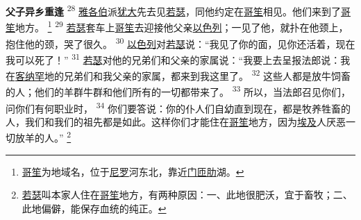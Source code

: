 \textbf{父子异乡重逢 }
\textsuperscript{28}
\uline{雅各伯}派\uline{犹大}先去见\uline{若瑟}，同他约定在\uline{哥笙}相见。他们来到了\uline{哥笙}地方。
\footnote{\uline{哥笙}为地域名，位于\uline{尼罗}河东北，靠近\uline{门匝肋}湖。}
\textsuperscript{29}
\uline{若瑟}套车上\uline{哥笙}去迎接他父亲\uline{以色列}；一见了他，就扑在他颈上，抱住他的颈，哭了很久。
\textsuperscript{30}
\uline{以色列}对\uline{若瑟}说：“我见了你的面，见你还活着，现在我可以死了！”
\textsuperscript{31}
\uline{若瑟}对他的兄弟们和父亲的家属说：“我要上去呈报法郎说：我在\uline{客纳罕}地的兄弟们和我父亲的家属，都来到我这里了。
\textsuperscript{32}
这些人都是放牛饲畜的人；他们的羊群牛群和他们所有的一切都带来了。
\textsuperscript{33}
所以，当法郎召见你们，问你们有何职业时，
\textsuperscript{34}
你们要答说：你的仆人们自幼直到现在，都是牧养牲畜的人，我们和我们的祖先都是如此。这样你们才能住在\uline{哥笙}地方，因为\uline{埃及}人厌恶一切放羊的人。”
\footnote{\uline{若瑟}叫本家人住在\uline{哥笙}地方，有两种原因：一、此地很肥沃，宜于畜牧；二、此地偏僻，能保存血统的纯正。}